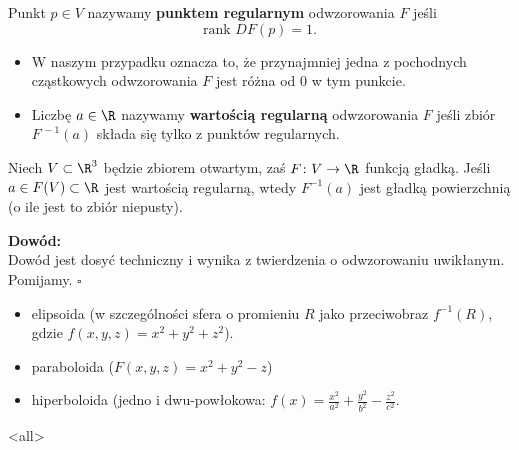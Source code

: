 \begin{frame}[<+->]
\begin{definicja}
Punkt $p\in V$ nazywamy \textbf{punktem regularnym}  odwzorowania $F$ jeśli 
\[\text{rank }DF(p)=1.\]
\end{definicja}


\begin{itemize}

\item {}W naszym przypadku oznacza to, że przynajmniej jedna z pochodnych cząstkowych odwzorowania $F$ jest różna od $0$ w tym punkcie.
\item Liczbę $a\in \R$ nazywamy \textbf{wartością regularną} odwzorowania $F$ jeśli zbiór $F^{\,-1}(a)$ składa się tylko z punktów regularnych.
\end{itemize}

\end{frame}
\begin{frame}

\begin{twierdzenie}Niech $V\subset \R^3$ będzie zbiorem otwartym, zaś $F\colon V\to \R$ funkcją gładką. Jeśli $a\in F(V)\subset \R$ jest wartością regularną, wtedy $F^{-1}(a)$ jest gładką powierzchnią (o ile jest to zbiór niepusty).
\end{twierdzenie}

\pause \textcolor{ared}{\textbf{Dowód:}}\\
Dowód jest dosyć techniczny i wynika z twierdzenia o odwzorowaniu uwikłanym. Pomijamy.
\hfill $\square$

\end{frame}
\begin{frame}

\begin{przyklad}
\begin{itemize}[<+->]
\item elipsoida (w szczególności sfera o promieniu $R$ jako przeciwobraz $f^{-1}(R)$, gdzie $f(x,y,z)=x^2+y^2+z^2$). 
\begin{center}

\end{center}

\item paraboloida ($F(x,y,z)=x^2+y^2-z$)
\item hiperboloida (jedno i dwu-powłokowa: $f(x)=\frac{x^2}{a^2}+\frac{y^2}{b^2}-\frac{z^2}{c^2}.$
\end{itemize}
\end{przyklad}

\end{frame}

\mode<all> 

